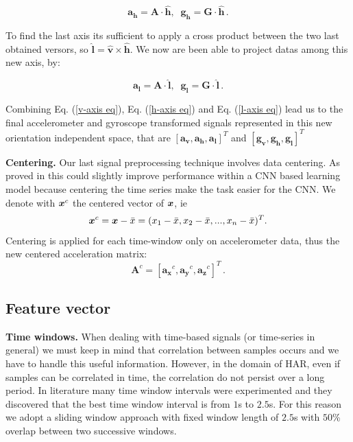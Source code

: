 \begin{equation}
	\label{h-axis eq}
	\boldsymbol{a_{h}} = \boldsymbol{A} \cdot \boldsymbol{\hat{h}} , \;\; \boldsymbol{g_{h}} = \boldsymbol{G} \cdot \boldsymbol{\hat{h}} \,.
\end{equation}

To find the last axis its sufficient to apply a cross product between the two last obtained versors, so $ \boldsymbol{\hat{l}} = \boldsymbol{\hat{v}} \times \boldsymbol{\hat{h}} $. We now are been able to project datas among this new axis, by:

\begin{equation}
	\label{l-axis eq}
	\boldsymbol{a_{l}} = \boldsymbol{A} \cdot \boldsymbol{\hat{l}} , \;\; \boldsymbol{g_{l}} = \boldsymbol{G} \cdot \boldsymbol{\hat{l}} \,.
\end{equation}

Combining Eq. (\ref{v-axis eq}), Eq. (\ref{h-axis eq}) and Eq. (\ref{l-axis eq}) lead us to the final accelerometer and gyroscope transformed signals represented in this new orientation independent space, that are $[\boldsymbol{a_{v}}, \boldsymbol{a_{h}}, \boldsymbol{a_{l}}]^T $ and $ [\boldsymbol{g_{v}}, \boldsymbol{g_{h}}, \boldsymbol{g_{l}}]^T $

\vspace{1em}
\textbf{Centering.}
Our last signal preprocessing technique involves data centering. As proved in \cite{ignatov2018real} this could slightly
improve performance within a CNN based learning model because
centering the time series make the task easier for the CNN. We denote with $\boldsymbol{x}^{c}$ the centered vector of $\boldsymbol{x}$, ie
\begin{equation}
  \label{eq:centering-func}
  \x^{c} = \x - \bar{x} = (x_1-\bar{x}, x_2-\bar{x},..., x_n-\bar{x})^T.
\end{equation}
Centering is applied for each time-window only on accelerometer data, thus the new centered acceleration matrix:
\begin{equation}
  \label{eq:centering-accelerometer-data}
  \boldsymbol{A}^{c} = [\boldsymbol{a_{x}}^{c}, \boldsymbol{a_{y}}^{c}, \boldsymbol{a_{z}}^{c}]^T \,.
\end{equation}


\subsection{Feature vector}
\label{subsec:feature-vector}

\textbf{Time windows.} When dealing with time-based signals (or
time-series in general) we must keep in mind that correlation between
samples occurs and we have to handle this useful information. However,
in the domain of HAR, even if samples can be correlated in time, the
correlation do not persist over a long period. In literature many time
window intervals were experimented \cite{ignatov2018real} and they
discovered that the best time window interval is from $1$s to
$2.5$s. For this reason we adopt a sliding window approach with fixed
window length of $2.5$s with $50$\% overlap between two successive
windows.


